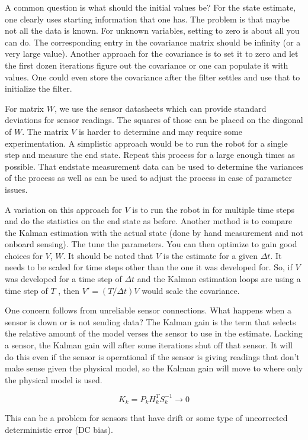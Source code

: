 A common question is what should the initial values be? For the state
estimate, one clearly uses starting information that one has. The
problem is that maybe not all the data is known. For unknown variables,
setting to zero is about all you can do. The corresponding entry in the
covariance matrix should be infinity (or a very large value). Another
approach for the covariance is to set it to zero and let the first dozen
iterations figure out the covariance or one can populate it with values.
One could even store the covariance after the filter settles and use
that to initialize the filter.

For matrix \(W\), we use the sensor datasheets which can provide
standard deviations for sensor readings. The squares of those can be
placed on the diagonal of \(W\). The matrix \(V\) is harder to determine
and may require some experimentation. A simplistic approach would be to
run the robot for a single step and measure the end state. Repeat this
process for a large enough times as possible. That endstate measurement
data can be used to determine the variances of the process as well as
can be used to adjust the process in case of parameter issues.

A variation on this approach for \(V\) is to run the robot in for
multiple time steps and do the statistics on the end state as before.
Another method is to compare the Kalman estimation with the actual state
(done by hand measurement and not onboard sensing). The tune the
parameters. You can then optimize to gain good choices for \(V\), \(W\).
It should be noted that \(V\) is the estimate for a given \(\Delta t\).
It needs to be scaled for time steps other than the one it was developed
for. So, if \(V\) was developed for a time step of \(\Delta t\) and the
Kalman estimation loops are using a time step of \(T\) , then
\(V' = (T/ \Delta t) V\) would scale the covariance.

One concern follows from unreliable sensor connections. What happens
when a sensor is down or is not sending data? The Kalman gain is the
term that selects the relative amount of the model verses the sensor to
use in the estimate. Lacking a sensor, the Kalman gain will after some
iterations shut off that sensor. It will do this even if the sensor is
operational if the sensor is giving readings that don't make sense given
the physical model, so the Kalman gain will move to where only the
physical model is used.

\[K_k = P_kH_k^TS_k^{-1} \to 0\]

This can be a problem for sensors that have drift or some type of
uncorrected deterministic error (DC bias).


